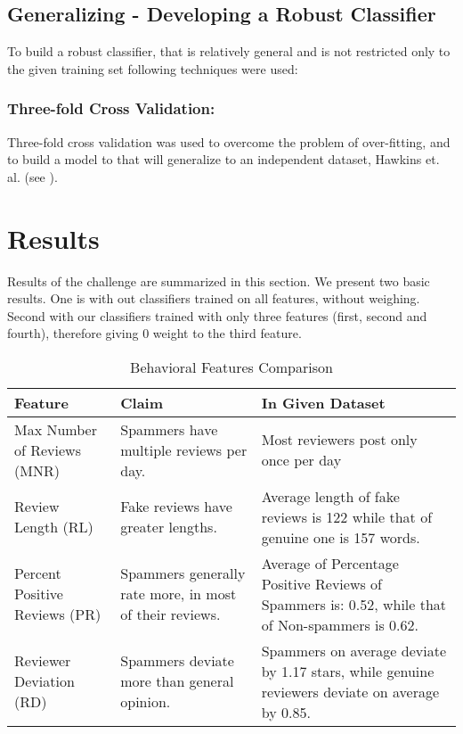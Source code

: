 \documentclass{llncs}
\begin{document}
\subsection{Generalizing - Developing a Robust Classifier}
To build a robust classifier, that is relatively general and is not restricted only to the given training set following techniques were used:

\subsubsection{Three-fold Cross Validation:} Three-fold cross validation was used to overcome the problem of over-fitting, and to build a model to that will generalize to an independent dataset, Hawkins et. al. (see \cite{hawkins:eke}).  


\section{Results}
Results of the challenge are summarized in this section. We present two basic results. One is with out classifiers trained on all features, without weighing. Second with our classifiers trained with only three features (first, second and fourth), therefore giving 0 weight to the third feature.

\begin{table}
\centering
  \caption{Behavioral Features Comparison}
\begin{tabular}{ |p{3cm}|p{4cm}| p{4cm}|}
 \hline
 Feature                        &Claim                  &In Given Dataset\\
 \hline
Max Number of Reviews (MNR)     &Spammers have multiple reviews per day.  &Most reviewers post only once per day\\
 \hline
Review Length (RL)  &Fake reviews have greater lengths.   &Average length of fake reviews is 122 while that of genuine one is 157 words.\\
 \hline
Percent Positive Reviews (PR)   &Spammers generally rate more, in most of their reviews.   &Average of Percentage Positive Reviews of Spammers is: 0.52, while that of Non-spammers is 0.62.\\
 \hline
Reviewer Deviation (RD)               &Spammers deviate more than general opinion.     &Spammers on average deviate by 1.17 stars, while genuine reviewers deviate on average by 0.85.\\

  \hline
\end{tabular}
\label{table}
\end{table}
\end{document}
